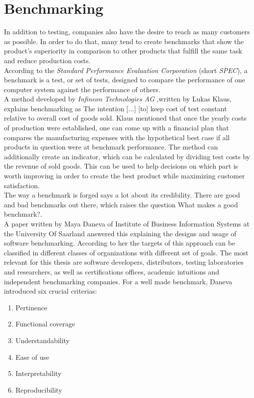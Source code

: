 \section{Benchmarking}
In addition to testing, companies also have the desire to reach as many customers as possible. In order to do that, many tend to create benchmarks that show the product's superiority in comparison to other products that fulfill the same task and reduce production costs.\\
According to the \textit{Standard Performance Evaluation Corporation} (short \textit{SPEC}), a benchmark is a \dq test, or set of tests, designed to compare the performance of one computer system against the performance of others\dq{}\cite{spec-benchmark}.\\
A method developed by \textit{Infineon Technologies AG} ,written by Lukas Klaus, explains benchmarking as \dq The intention [...] [to] keep cost of test constant relative to overall cost of goods sold\dq{}. Klaus mentioned that once the yearly costs of production were established, one can come up with a financial plan that compares the manufacturing expenses with the \dq hypothetical best case if all products in question were at benchmark performance\dq{}. The method can additionally create an indicator, which can be calculated by dividing test costs by the revenue of sold goods\cite{4221595}. This can be used to help decisions on which part is worth improving in order to create the best product while maximizing customer satisfaction.\\  
The way a benchmark is forged says a lot about its credibility. There are good and bad benchmarks out there, which raises the question \dq What makes a good benchmark?\dq{}.\\
A paper written by Maya Daneva of Institute of Business Information Systems at the University Of Saarland answered this explaining the designs and usage of software benchmarking. According to her the targets of this approach can be classified in different classes of organizations with different set of goals. The most relevant for this thesis are software developers, distributors, testing laboratories and researchers, as well as certifications offices, academic intuitions and independent benchmarking companies. For a well made benchmark, Daneva introduced six crucial criterias\cite{Daneva1995}:
\begin{enumerate}
	\item Pertinence 
	\item Functional coverage   
	\item Understandability 
	\item Ease of use  
	\item Interpretability
	\item Reproducibility
\end{enumerate}    
